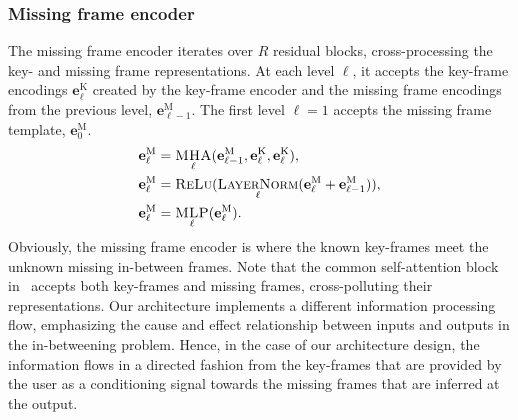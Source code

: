 \documentclass[letterpaper]{article} \usepackage[]{aaai23}  \usepackage{times}  \usepackage{helvet}  \usepackage{courier}  \usepackage[hyphens]{url}  \usepackage{graphicx} \urlstyle{rm} \def\UrlFont{\rm}  \usepackage{natbib}  \usepackage{caption} \frenchspacing  \setlength{\pdfpagewidth}{8.5in} \setlength{\pdfpageheight}{11in}
\renewcommand{\vec}[1]{\mathbf{#1}}
\DeclareMathOperator{\mha}{\textsc{MHA}}
\DeclareMathOperator{\mlp}{\textsc{MLP}}
\DeclareMathOperator{\relu}{\textsc{ReLu}}
\DeclareMathOperator{\layernorm}{\textsc{LayerNorm}}
\begin{document}
\subsubsection{Missing frame encoder} 
The missing frame encoder iterates over $R$ residual blocks, cross-processing the key- and missing frame representations. At each level $\ell$, it accepts the key-frame encodings $\vec{e}_{\ell}^{\textrm{K}}$ created by the key-frame encoder and the missing frame encodings from the previous level, $\vec{e}_{\ell-1}^{\textrm{M}}$. The first level $\ell=1$ accepts the missing frame template, $\vec{e}_{0}^{\textrm{M}}$.
\begin{align}
    \vec{e}_{\ell}^{\textrm{M}}  &= \mha_{\ell}(\vec{e}_{\ell-1}^{\textrm{M}}, \vec{e}_{\ell}^{\textrm{K}}, \vec{e}_{\ell}^{\textrm{K}}), \nonumber \\
    \vec{e}_{\ell}^{\textrm{M}} &= \relu(\layernorm_{\ell}(\vec{e}_{\ell}^{\textrm{M}} + \vec{e}_{\ell-1}^{\textrm{M}})), \nonumber \\
    \vec{e}_{\ell}^{\textrm{M}} &= \mlp_{\ell}(\vec{e}_{\ell}^{\textrm{M}}). \nonumber 
\end{align}
Obviously, the missing frame encoder is  where the known key-frames meet the unknown missing in-between frames. Note that the common self-attention block in~\citep{duan2021singleshot} accepts both key-frames and missing frames, cross-polluting their representations. Our architecture implements a different information processing flow, emphasizing the cause and effect relationship between inputs and outputs in the in-betweening problem. Hence, in the case of our architecture design, the information flows in a directed fashion from the key-frames that are provided by the user as a conditioning signal towards the missing frames that are inferred at the output.
\end{document}
